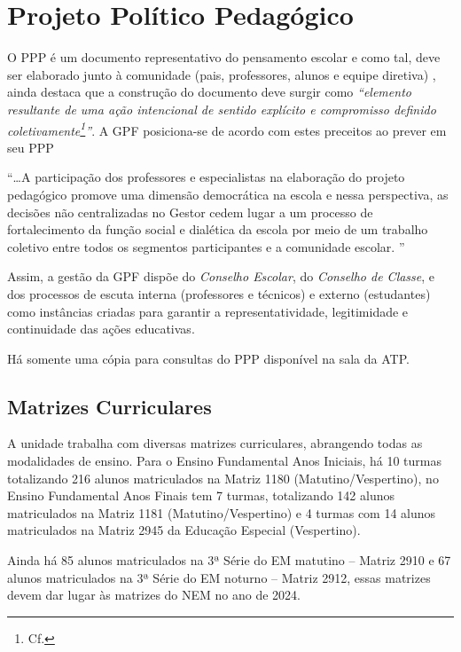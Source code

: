 \section{Projeto Político Pedagógico} %
\label{sec:Projeto Político Pedagógico}
O \ac{PPP} é um documento representativo do pensamento escolar e como tal, deve ser elaborado junto à comunidade (pais, professores, alunos e equipe diretiva) \cite{CARVALHO:2012a},  ainda destaca que a construção do documento deve surgir como \textit{``elemento resultante de uma ação intencional de sentido explícito e compromisso definido coletivamente\footnote{Cf. }''}. A \ac{GPF} posiciona-se de acordo com estes preceitos ao prever em seu \ac{PPP}

\begin{citacao}
	``\ldots A participação dos professores e especialistas na elaboração do projeto pedagógico promove uma dimensão democrática na escola e nessa perspectiva, as decisões não centralizadas no Gestor cedem lugar a um processo de fortalecimento da função social e dialética da escola por meio de um trabalho coletivo entre todos os segmentos participantes e a comunidade escolar. '' \cite[pp.~5]{FARACO:2023}
\end{citacao}
Assim, a gestão da \ac{GPF} dispõe do \emph{Conselho Escolar}, do \emph{Conselho de Classe}, e dos processos de escuta interna (professores e técnicos) e externo (estudantes) como instâncias criadas para garantir a representatividade, legitimidade e continuidade das ações educativas.

Há somente uma cópia para consultas do \ac{PPP} disponível na sala da \ac{ATP}.

\subsection{Matrizes Curriculares}
A unidade trabalha com diversas matrizes curriculares, abrangendo todas as modalidades de ensino. Para o Ensino Fundamental Anos Iniciais, há 10 turmas totalizando 216 alunos matriculados na Matriz 1180 (Matutino/Vespertino), no Ensino Fundamental Anos Finais tem 7 turmas, totalizando 142 alunos matriculados na Matriz 1181 (Matutino/Vespertino) e 4 turmas com 14 alunos matriculados na Matriz 2945 da Educação Especial (Vespertino).

Ainda há 85 alunos matriculados na 3ª Série do \ac{EM} matutino -- Matriz 2910 e 67 alunos matriculados na 3ª Série do \ac{EM} noturno -- Matriz 2912, essas matrizes devem dar lugar às matrizes do \ac{NEM} no ano de 2024.

